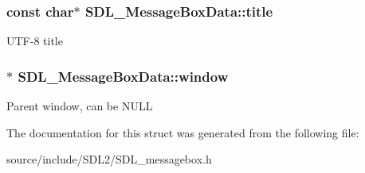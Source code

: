 \subsubsection[{title}]{\setlength{\rightskip}{0pt plus 5cm}const char$\ast$ S\+D\+L\+\_\+\+Message\+Box\+Data\+::title}\label{struct_s_d_l___message_box_data_a93ceeafeed20b553ad4c86c9be37f117}
U\+T\+F-\/8 title \hypertarget{struct_s_d_l___message_box_data_a5c333bc93705c66068e140bc28daedcb}{}
\subsubsection[{window}]{$\ast$ S\+D\+L\+\_\+\+Message\+Box\+Data\+::window}\label{struct_s_d_l___message_box_data_a5c333bc93705c66068e140bc28daedcb}
Parent window, can be N\+U\+L\+L 

The documentation for this struct was generated from the following file\+:\begin{DoxyCompactItemize}
\item 
source/include/\+S\+D\+L2/S\+D\+L\+\_\+messagebox.\+h\end{DoxyCompactItemize}

